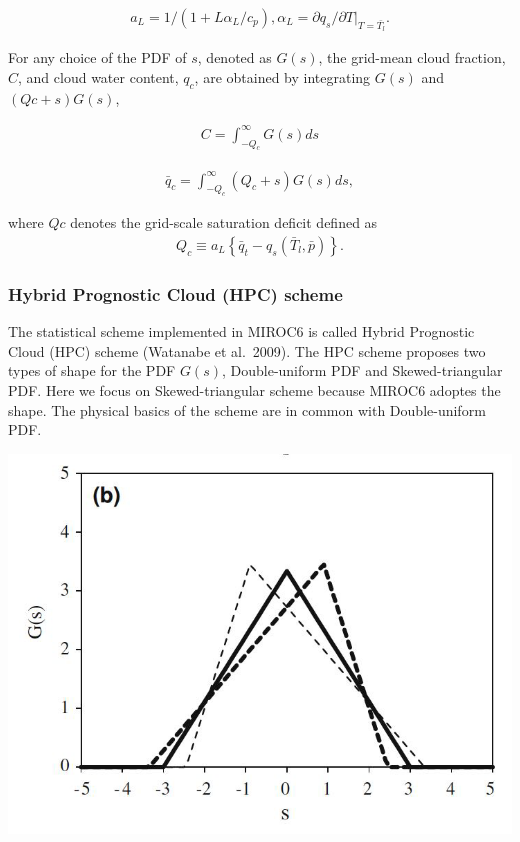 \begin{eqnarray}
a_{L}=1 /\left(1+L \alpha_{L} / c_{p}\right), \alpha_{L}=\partial q_{s} /\left.\partial T\right|_{T=\bar{T_l}}.
\end{eqnarray}

For any choice of the PDF of \(s\), denoted as \(G(s)\), the grid-mean
cloud fraction, \(C\), and cloud water content, \(q_c\), are obtained by
integrating \(G(s)\) and \((Qc + s)G(s)\),

\begin{eqnarray}
C=\int_{-Q_{c}}^{\infty}G(s)ds
\end{eqnarray}

\begin{eqnarray}
\bar{q}_{c}=\int_{-Q_{c}}^{\infty}\left(Q_{c}+s\right)G(s)ds,
\end{eqnarray}

where \(Qc\) denotes the grid-scale saturation deficit defined as \begin{eqnarray}
Q_{c} \equiv a_{L}\left\{\bar{q}_{t}-q_{s}\left(\bar{T}_{l}, \bar{p}\right)\right\}.
\end{eqnarray}

\hypertarget{hybrid-prognostic-cloud-hpc-scheme}{%
\subsubsection{Hybrid Prognostic Cloud (HPC)
scheme}\label{hybrid-prognostic-cloud-hpc-scheme}}

The statistical scheme implemented in MIROC6 is called Hybrid Prognostic
Cloud (HPC) scheme (Watanabe et al.~2009). The HPC scheme proposes two
types of shape for the PDF \(G(s)\), Double-uniform PDF and
Skewed-triangular PDF. Here we focus on Skewed-triangular scheme because
MIROC6 adoptes the shape. The physical basics of the scheme are in
common with Double-uniform PDF.

\includegraphics{Hotta_pmlsc_PDF.png}

